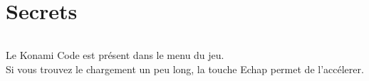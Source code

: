 \documentclass[titlepage, 13px, a4paper]{report}
\begin{document}


\part{Secrets} 
\paragraph*{} \hspace{0pt}
Le Konami Code est présent dans le menu du jeu. \\
Si vous trouvez le chargement un peu long, la touche Echap permet de l'accélerer. \\


\end{document}

